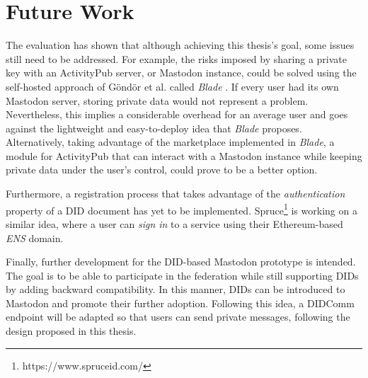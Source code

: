 \section{Future Work}
The evaluation has shown that although achieving this thesis's goal, some issues still need to be addressed. For example, the risks imposed by sharing a private key with an ActivityPub server, or Mastodon instance, could be solved using the self-hosted approach of Göndör et al. called \emph{Blade} \cite{inproceedings}. If every user had its own Mastodon server, storing private data would not represent a problem. Nevertheless, this implies a considerable overhead for an average user and goes against the lightweight and easy-to-deploy idea that \emph{Blade} proposes. Alternatively, taking advantage of the marketplace implemented in \emph{Blade}, a module for ActivityPub that can interact with a Mastodon instance while keeping private data under the user's control, could prove to be a better option. 

Furthermore, a registration process that takes advantage of the \emph{authentication} property of a DID document has yet to be implemented. Spruce\footnote{https://www.spruceid.com/} is working on a similar idea, where a user can \emph{sign in} to a service using their Ethereum-based \emph{ENS} domain. 

Finally, further development for the DID-based Mastodon prototype is intended. The goal is to be able to participate in the federation while still supporting DIDs by adding backward compatibility. In this manner, DIDs can be introduced to Mastodon and promote their further adoption. Following this idea, a DIDComm endpoint will be adapted so that users can send private messages, following the design proposed in this thesis.